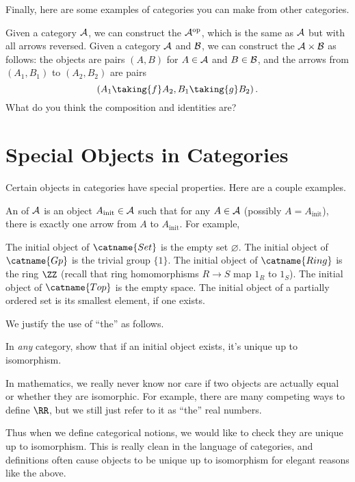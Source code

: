 Finally, here are some examples of categories you can make from other categories.
\begin{example}
	\listhack
	\begin{enumerate}[(a)]
		\ii Given a category $\AA$, we can construct the 
		$\AA^{\text{op}}$, which is the same as $\AA$ but with all arrows reversed.
		\ii Given a category $\AA$ and $\BB$, we can construct the  $\AA \times \BB$
		as follows: the objects are pairs $(A, B)$ for $A \in \AA$ and $B \in \BB$,
		and the arrows from $(A_1, B_1)$ to $(A_2, B_2)$
		are pairs \[ \left( A_1 \taking{f} A_2, B_1 \taking{g} B_2 \right). \]
		What do you think the composition and identities are?
	\end{enumerate}
\end{example}

\section{Special Objects in Categories}
Certain objects in categories have special properties.
Here are a couple examples.
\begin{example}
	An  of $\AA$ is an object
	$A_{\text{init}} \in \AA$ such that for any $A \in \AA$ (possibly $A = A_{\text{init}}$),
	there is exactly one arrow from $A$ to $A_{\text{init}}$.
	For example,
	\begin{enumerate}[(a)]
		\ii The initial object of $\catname{Set}$ is the empty set $\varnothing$.
		\ii The initial object of $\catname{Gp}$ is the trivial group $\{1\}$.
		\ii The initial object of $\catname{Ring}$ is the ring $\ZZ$
		(recall that ring homomorphisms $R \to S$ map $1_R$ to $1_S$).
		\ii The initial object of $\catname{Top}$ is the empty space.
		\ii The initial object of a partially ordered set is its smallest element, if one exists.
	\end{enumerate}
\end{example}

We justify the use of ``the'' as follows.
\begin{exercise}
	In \emph{any} category,
	show that if an initial object exists,
	it's unique up to isomorphism.
\end{exercise}
\begin{remark}
	In mathematics, we really never know nor care if two objects are actually equal
	or whether they are isomorphic.
	For example, there are many competing ways to define $\RR$,
	but we still just refer to it as ``the'' real numbers.

	Thus when we define categorical notions, we would like to check they are
	unique up to isomorphism.
	This is really clean in the language of categories, and definitions
	often cause objects to be unique up to isomorphism for elegant reasons like the above.
\end{remark}


